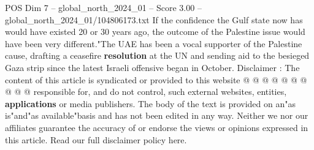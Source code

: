 \begin{textsample}{POS Dim 7 – global\_north\_2024\_01 – Score 3.00 – global\_north\_2024\_01/104806173.txt}
If the confidence the Gulf state now has would have existed 20 or 30 years ago, the outcome of the Palestine issue would have been very different."The UAE has been a vocal supporter of the Palestine cause, drafting a ceasefire \textbf{resolution} at the UN and sending aid to the besieged Gaza strip since the latest Israeli offensive began in October.
Disclaimer : The content of this article is syndicated or provided to this website @ @ @ @ @ @ @ @ @ @ responsible for, and do not control, such external websites, entities, \textbf{applications} or media publishers.
The body of the text is provided on an"as is"and"as available"basis and has not been edited in any way.
Neither we nor our affiliates guarantee the accuracy of or endorse the views or opinions expressed in this article.
Read our full disclaimer policy here.

\end{textsample}
